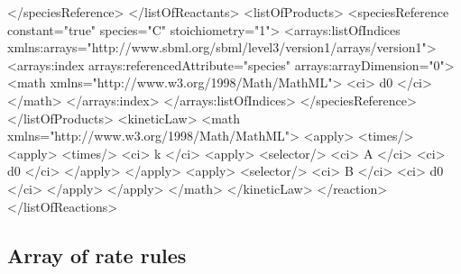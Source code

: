 \begin{example}
            </speciesReference>
        </listOfReactants>
        <listOfProducts>
            <speciesReference constant="true" species="C" stoichiometry="1">
                <arrays:listOfIndices
                    xmlns:arrays="http://www.sbml.org/sbml/level3/version1/arrays/version1">
                    <arrays:index arrays:referencedAttribute="species" arrays:arrayDimension="0">
                        <math xmlns="http://www.w3.org/1998/Math/MathML">
                            <ci> d0 </ci>
                        </math>
                    </arrays:index>
                </arrays:listOfIndices>
            </speciesReference>
        </listOfProducts>
        <kineticLaw>
            <math xmlns="http://www.w3.org/1998/Math/MathML">
                <apply>
                    <times/>
                    <apply>
                        <times/>
                        <ci> k </ci>
                        <apply>
                            <selector/>
                            <ci> A </ci>
                            <ci> d0 </ci>
                        </apply>
                    </apply>
                    <apply>
                        <selector/>
                        <ci> B </ci>
                        <ci> d0 </ci>
                    </apply>
                </apply>
            </math>
        </kineticLaw>
    </reaction>
</listOfReactions>
\end{example}



\subsection{Array of rate rules}

